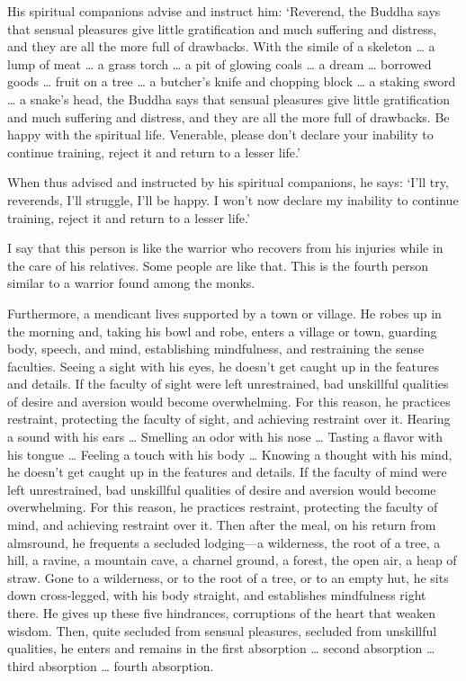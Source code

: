 \documentclass[12pt,openany]{book}%
\begin{document}
His spiritual companions advise and instruct him: ‘Reverend, the Buddha says that sensual pleasures give little gratification and much suffering and distress, and they are all the more full of drawbacks. With the simile of a skeleton … a lump of meat … a grass torch … a pit of glowing coals … a dream … borrowed goods … fruit on a tree … a butcher’s knife and chopping block … a staking sword … a snake’s head, the Buddha says that sensual pleasures give little gratification and much suffering and distress, and they are all the more full of drawbacks. Be happy with the spiritual life. Venerable, please don’t declare your inability to continue training, reject it and return to a lesser life.’ 

When thus advised and instructed by his spiritual companions, he says: ‘I’ll try, reverends, I’ll struggle, I’ll be happy. I won’t now declare my inability to continue training, reject it and return to a lesser life.’ 

I say that this person is like the warrior who recovers from his injuries while in the care of his relatives. Some people are like that. This is the fourth person similar to a warrior found among the monks. 

Furthermore, a mendicant lives supported by a town or village. He robes up in the morning and, taking his bowl and robe, enters a village or town, guarding body, speech, and mind, establishing mindfulness, and restraining the sense faculties. Seeing a sight with his eyes, he doesn’t get caught up in the features and details. If the faculty of sight were left unrestrained, bad unskillful qualities of desire and aversion would become overwhelming. For this reason, he practices restraint, protecting the faculty of sight, and achieving restraint over it. Hearing a sound with his ears … Smelling an odor with his nose … Tasting a flavor with his tongue … Feeling a touch with his body … Knowing a thought with his mind, he doesn’t get caught up in the features and details. If the faculty of mind were left unrestrained, bad unskillful qualities of desire and aversion would become overwhelming. For this reason, he practices restraint, protecting the faculty of mind, and achieving restraint over it. Then after the meal, on his return from almsround, he frequents a secluded lodging—a wilderness, the root of a tree, a hill, a ravine, a mountain cave, a charnel ground, a forest, the open air, a heap of straw. Gone to a wilderness, or to the root of a tree, or to an empty hut, he sits down cross-legged, with his body straight, and establishes mindfulness right there. He gives up these five hindrances, corruptions of the heart that weaken wisdom. Then, quite secluded from sensual pleasures, secluded from unskillful qualities, he enters and remains in the first absorption … second absorption … third absorption … fourth absorption. 
\end{document}
